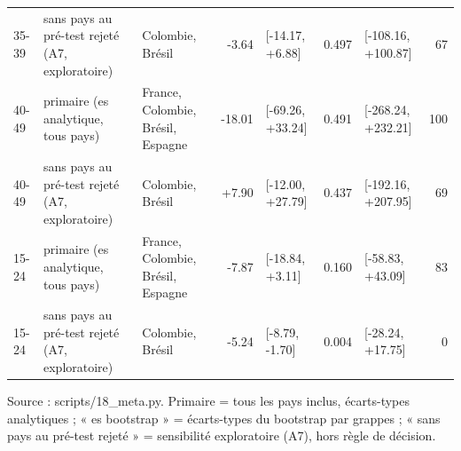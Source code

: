 \begin{table}[htbp]
\begin{threeparttable}
\begin{tabular}{p{1.4cm}p{2.4cm}p{2.6cm}rp{2.3cm}rp{2.3cm}r}
35-39 & sans pays au pré-test rejeté (A7, exploratoire) & Colombie, Brésil & -3.64 & [-14.17, +6.88] & 0.497 & [-108.16, +100.87] & 67 \\
40-49 & primaire (es analytique, tous pays) & France, Colombie, Brésil, Espagne & -18.01 & [-69.26, +33.24] & 0.491 & [-268.24, +232.21] & 100 \\
40-49 & sans pays au pré-test rejeté (A7, exploratoire) & Colombie, Brésil & +7.90 & [-12.00, +27.79] & 0.437 & [-192.16, +207.95] & 69 \\
15-24 & primaire (es analytique, tous pays) & France, Colombie, Brésil, Espagne & -7.87 & [-18.84, +3.11] & 0.160 & [-58.83, +43.09] & 83 \\
15-24 & sans pays au pré-test rejeté (A7, exploratoire) & Colombie, Brésil & -5.24 & [-8.79, -1.70] & 0.004 & [-28.24, +17.75] & 0 \\
\bottomrule
\end{tabular}
\begin{tablenotes}\footnotesize
\item Source : scripts/18\_meta.py. Primaire = tous les pays inclus, écarts-types analytiques ; « es bootstrap » = écarts-types du bootstrap par grappes ; « sans pays au pré-test rejeté » = sensibilité exploratoire (A7), hors règle de décision.
\end{tablenotes}
\end{threeparttable}
\end{table}
